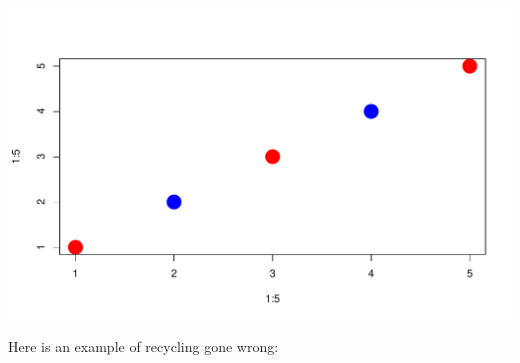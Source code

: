 \documentclass[]{book}
\theoremstyle{definition}
\theoremstyle{definition}
\theoremstyle{definition}
\theoremstyle{remark}
\begin{document}
\begin{center}\includegraphics[width=0.7\linewidth]{DS4PS-I_files/figure-latex/unnamed-chunk-72-1} \end{center}

Here is an example of recycling gone wrong:
\end{document}
